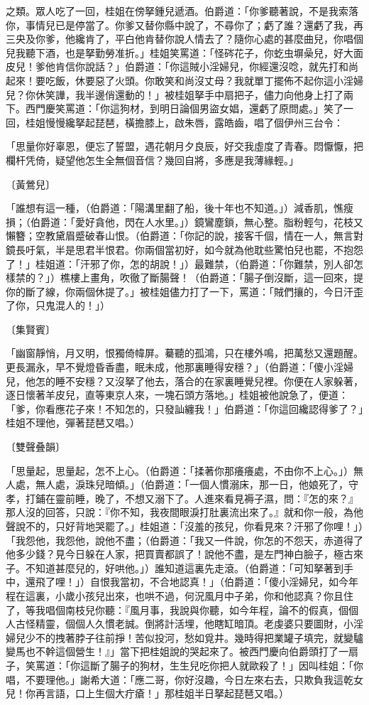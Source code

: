 之類。眾人吃了一回，桂姐在傍拏鍾兒遞酒。伯爵道：「你爹聽著說，不是我索落你，事情兒已是停當了。你爹又替你縣中說了，不尋你了；虧了誰？還虧了我，再三央及你爹，他纔肯了，平白他肯替你說人情去了？隨你心處的甚麼曲兒，你唱個兒我聽下酒，也是拏勤勞准折。」桂姐笑罵道：「怪硶花子，你虼虫塀喿兒，好大面皮兒！爹他肯信你說話？」伯爵道：「你這賊小淫婦兒，你經還沒唸，就先打和尚起來！要吃飯，休要惡了火頭。你敢笑和尚沒丈母？我就單丁擺佈不起你這小淫婦兒？你休笑譁，我半邊俏還動的！」被桂姐拏手中扇把子，儘力向他身上打了兩下。西門慶笑罵道：「你這狗材，到明日論個男盜女娼，還虧了原問處。」笑了一回，桂姐慢慢纔拏起琵琶，橫擔膝上，啟朱唇，露皓齒，唱了個伊州三台令：

「思量你好辜恩，便忘了誓盟，遇花朝月夕良辰，好交我虛度了青春。悶懨懨，把欄杆凭倚，疑望他怎生全無個音信？幾回自將，多應是我薄緣輕。」

〔黃鶯兒〕

「誰想有這一種，（伯爵道：「陽溝里翻了船，後十年也不知道。」）減香肌，憔瘦損；（伯爵道：「愛好貪他，閃在人水里。」）鏡鸞塵鎖，無心整。脂粉輕勻，花枝又懶簪；空教黛眉蹙破春山恨。（伯爵道：「你記的說，接客千個，情在一人，無言對鏡長吁氣，半是思君半恨君。你兩個當初好，如今就為他耽些驚怕兒也罷，不抱怨了！」桂姐道：「汗邪了你，怎的胡說！」）最難禁，（伯爵道：「你難禁，別人卻怎樣禁的？」）樵樓上畫角，吹徹了斷腸聲！（伯爵道：「腸子倒沒斷，這一回來，提你的斷了線，你兩個休提了。」被桂姐儘力打了一下，罵道：「賊們攘的，今日汗歪了你，只鬼混人的！」）

〔集賢賓〕

「幽窗靜悄，月又明，恨獨倚幃屏。驀聽的孤鴻，只在樓外鳴，把萬愁又還題醒。更長漏永，早不覺燈昏香盡，眠未成，他那裏睡得安穩？」（伯爵道：「傻小淫婦兒，他怎的睡不安穩？又沒拏了他去，落合的在家裏睡覺兒裡。你便在人家躲著，逐日懷著羊皮兒，直等東京人來，一塊石頭方落地。」桂姐被他說急了，便道：「爹，你看應花子來！不知怎的，只發訕纏我！」伯爵道：「你這回纔認得爹了？」桂姐不理他，彈著琵琶又唱。）

〔雙聲叠韻〕

「思量起，思量起，怎不上心。（伯爵道：「揉著你那癢癢處，不由你不上心。」）無人處，無人處，淚珠兒暗傾。」（伯爵道：「一個人慣溺床，那一日，他娘死了，守孝，打鋪在靈前睡，晚了，不想又溺下了。人進來看見褥子濕，問：『怎的來？』那人沒的回答，只說：『你不知，我夜間眼淚打肚裏流出來了。』就和你一般，為他聲說不的，只好背地哭罷了。」桂姐道：「沒羞的孩兒，你看見來？汗邪了你哩！」）「我怨他，我怨他，說他不盡；（伯爵道：「我又一件說，你怎的不怨天，赤道得了他多少錢？見今日躲在人家，把買賣都誤了！說他不盡，是左門神白臉子，極古來子。不知道甚麼兒的，好哄他。」）誰知道這裏先走滾。（伯爵道：「可知拏著到手中，還飛了哩！」）自恨我當初，不合地認真！」（伯爵道：「傻小淫婦兒，如今年程在這裏，小歲小孩兒出來，也哄不過，何況風月中子弟，你和他認真？你且住了，等我唱個南枝兒你聽：『風月事，我說與你聽，如今年程，論不的假真，個個人古怪精靈，個個人久慣老誠。倒將計活埋，他瞎缸暗頂。老虔婆只要圖財，小淫婦兒少不的拽著脖子往前掙！苦似投河，愁如覓井。幾時得把業罐子填完，就變驢變馬也不幹這個營生！』」當下把桂姐說的哭起來了。被西門慶向伯爵頭打了一扇子，笑罵道：「你這斷了腸子的狗材，生生兒吃你把人就歐殺了！」因叫桂姐：「你唱，不要理他。」謝希大道：「應二哥，你好沒趣，今日左來右去，只欺負我這乾女兒！你再言語，口上生個大疔瘡！」那桂姐半日拏起琵琶又唱。）

